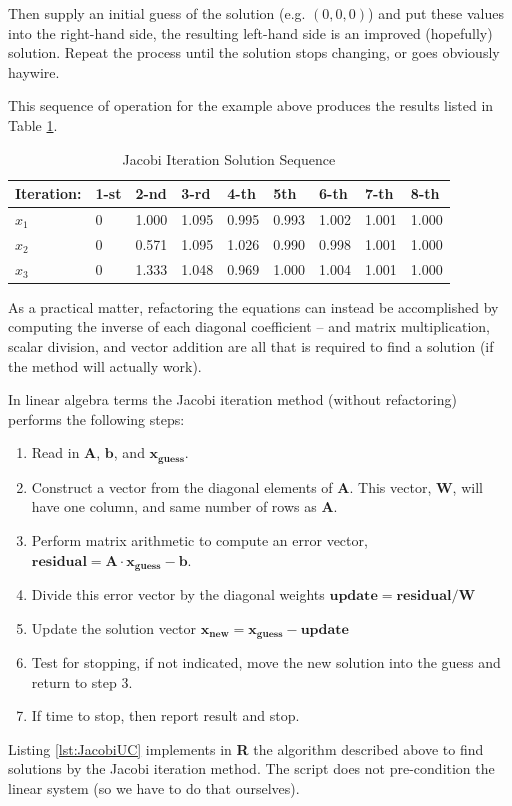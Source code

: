 Then supply an initial guess of the solution (e.g. $(0,0,0)$) and put these values into the right-hand side, the resulting left-hand side is an improved (hopefully) solution.
Repeat the process until the solution stops changing, or goes obviously haywire.

This sequence of operation for the example above produces the results listed in Table \ref{tab:jacobi}.

\begin{table}[h!]
   \centering
      \caption{Jacobi Iteration Solution Sequence}
   \begin{tabular}{lllllllll} %
      \toprule
Iteration:&1-st&2-nd&3-rd&4-th&5th&6-th&7-th&8-th\\
\hline
$x_1$&0&1.000&1.095&0.995&0.993&1.002&1.001&1.000\\
$x_2$&0&0.571&1.095&1.026&0.990&0.998&1.001&1.000\\
$x_3$&0&1.333&1.048&0.969&1.000&1.004&1.001&1.000\\
      \bottomrule
   \end{tabular}
   \label{tab:jacobi}
\end{table}

As a practical matter, refactoring the equations can instead be accomplished by computing the inverse of each diagonal coefficient -- and matrix multiplication, scalar division, and vector addition are all that is required to find a solution (if the method will actually work).

In linear algebra terms the Jacobi iteration method (without refactoring) performs the following steps:
\begin{enumerate}
\item Read in $\mathbf{A}$, $\mathbf{b}$, and $\mathbf{x_{guess}}$.
\item Construct a vector from the diagonal elements of $\mathbf{A}$.  This vector, $\mathbf{W}$, will have one column, and same number of rows as $\mathbf{A}$.
\item Perform matrix arithmetic to compute an error vector, $\mathbf{residual}=\mathbf{A} \cdot \mathbf{x_{guess}} - \mathbf{b}$.
\item Divide this error vector by the diagonal weights $\mathbf{update} = \mathbf{residual} / \mathbf{W}$
\item Update the solution vector $\mathbf{x_{new}} = \mathbf{x_{guess}} - \mathbf{update}$
\item Test for stopping, if not indicated, move the new solution into the guess and return to step 3.
\item If time to stop, then report result and stop.
\end{enumerate}
Listing \ref{lst:JacobiUC} implements in \textbf{R} the algorithm described above to find solutions by the Jacobi iteration method. 
The script does not pre-condition the linear system (so we have to do that ourselves).

